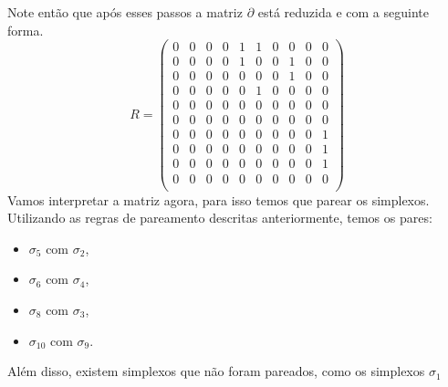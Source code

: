 Note então que após esses passos a matriz $\partial$ está reduzida e com
a seguinte forma.
\begin{equation}
  R = \begin{pmatrix}
                   0     &    0     &    0     &     0    &     1    &     1    &     0    &     0    &     0    &     0       \\
                   0     &    0     &    0     &     0    &     1    &     0    &     0    &     1    &     0    &     0       \\
                   0     &    0     &    0     &     0    &     0    &     0    &     0    &     1    &     0    &     0       \\
                   0     &    0     &    0     &     0    &     0    &     1    &     0    &     0    &     0    &     0       \\
                   0     &    0     &    0     &     0    &     0    &     0    &     0    &     0    &     0    &     0       \\
                   0     &    0     &    0     &     0    &     0    &     0    &     0    &     0    &     0    &     0       \\
                   0     &    0     &    0     &     0    &     0    &     0    &     0    &     0    &     0    &     1       \\
                   0     &    0     &    0     &     0    &     0    &     0    &     0    &     0    &     0    &     1       \\
                   0     &    0     &    0     &     0    &     0    &     0    &     0    &     0    &     0    &     1       \\
                   0     &    0     &    0     &     0    &     0    &     0    &     0    &     0    &     0    &     0       \\
  \end{pmatrix}
\end{equation}
Vamos interpretar a matriz agora, para isso temos que parear os simplexos.
Utilizando as regras de pareamento descritas anteriormente, temos os pares:
\begin{itemize}
  \item $\sigma_5$ com $\sigma_2$,
  \item $\sigma_6$ com $\sigma_4$,
  \item $\sigma_8$ com $\sigma_3$,
  \item $\sigma_{10}$ com $\sigma_9$.
\end{itemize}
Além disso, existem simplexos que não foram pareados, como os simplexos $\sigma_1$
